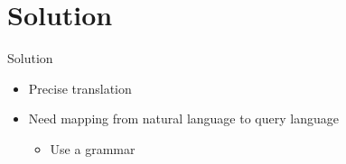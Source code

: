 \section{Solution} 
\begin{frame}{Solution} 
  \begin{itemize}
    \item Precise translation \pause
    \item Need mapping from natural language to query language \pause
      \begin{itemize}
        \item Use a grammar
      \end{itemize}
  \end{itemize}
  
\end{frame}

